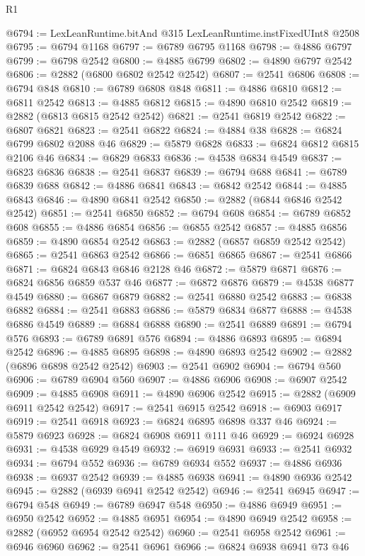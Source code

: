 \begin{lexlean}{R1}
\begin{coremodule}
@6794 := LexLeanRuntime.bitAnd @315 LexLeanRuntime.instFixedUInt8 @2508
@6795 := @6794 @1168
@6797 := @6789 @6795 @1168
@6798 := @4886 @6797
@6799 := @6798 @2542
@6800 := @4885 @6799
@6802 := @4890 @6797 @2542
@6806 := @2882 (@6800 @6802 @2542 @2542)
@6807 := @2541 @6806
@6808 := @6794 @848
@6810 := @6789 @6808 @848
@6811 := @4886 @6810
@6812 := @6811 @2542
@6813 := @4885 @6812
@6815 := @4890 @6810 @2542
@6819 := @2882 (@6813 @6815 @2542 @2542)
@6821 := @2541 @6819 @2542
@6822 := @6807 @6821
@6823 := @2541 @6822
@6824 := @4884 @38
@6828 := @6824 @6799 @6802 @2088 @46
@6829 := @5879 @6828
@6833 := @6824 @6812 @6815 @2106 @46
@6834 := @6829 @6833
@6836 := @4538 @6834 @4549
@6837 := @6823 @6836
@6838 := @2541 @6837
@6839 := @6794 @688
@6841 := @6789 @6839 @688
@6842 := @4886 @6841
@6843 := @6842 @2542
@6844 := @4885 @6843
@6846 := @4890 @6841 @2542
@6850 := @2882 (@6844 @6846 @2542 @2542)
@6851 := @2541 @6850
@6852 := @6794 @608
@6854 := @6789 @6852 @608
@6855 := @4886 @6854
@6856 := @6855 @2542
@6857 := @4885 @6856
@6859 := @4890 @6854 @2542
@6863 := @2882 (@6857 @6859 @2542 @2542)
@6865 := @2541 @6863 @2542
@6866 := @6851 @6865
@6867 := @2541 @6866
@6871 := @6824 @6843 @6846 @2128 @46
@6872 := @5879 @6871
@6876 := @6824 @6856 @6859 @537 @46
@6877 := @6872 @6876
@6879 := @4538 @6877 @4549
@6880 := @6867 @6879
@6882 := @2541 @6880 @2542
@6883 := @6838 @6882
@6884 := @2541 @6883
@6886 := @5879 @6834 @6877
@6888 := @4538 @6886 @4549
@6889 := @6884 @6888
@6890 := @2541 @6889
@6891 := @6794 @576
@6893 := @6789 @6891 @576
@6894 := @4886 @6893
@6895 := @6894 @2542
@6896 := @4885 @6895
@6898 := @4890 @6893 @2542
@6902 := @2882 (@6896 @6898 @2542 @2542)
@6903 := @2541 @6902
@6904 := @6794 @560
@6906 := @6789 @6904 @560
@6907 := @4886 @6906
@6908 := @6907 @2542
@6909 := @4885 @6908
@6911 := @4890 @6906 @2542
@6915 := @2882 (@6909 @6911 @2542 @2542)
@6917 := @2541 @6915 @2542
@6918 := @6903 @6917
@6919 := @2541 @6918
@6923 := @6824 @6895 @6898 @337 @46
@6924 := @5879 @6923
@6928 := @6824 @6908 @6911 @111 @46
@6929 := @6924 @6928
@6931 := @4538 @6929 @4549
@6932 := @6919 @6931
@6933 := @2541 @6932
@6934 := @6794 @552
@6936 := @6789 @6934 @552
@6937 := @4886 @6936
@6938 := @6937 @2542
@6939 := @4885 @6938
@6941 := @4890 @6936 @2542
@6945 := @2882 (@6939 @6941 @2542 @2542)
@6946 := @2541 @6945
@6947 := @6794 @548
@6949 := @6789 @6947 @548
@6950 := @4886 @6949
@6951 := @6950 @2542
@6952 := @4885 @6951
@6954 := @4890 @6949 @2542
@6958 := @2882 (@6952 @6954 @2542 @2542)
@6960 := @2541 @6958 @2542
@6961 := @6946 @6960
@6962 := @2541 @6961
@6966 := @6824 @6938 @6941 @73 @46

\end{coremodule}
\end{lexlean}
